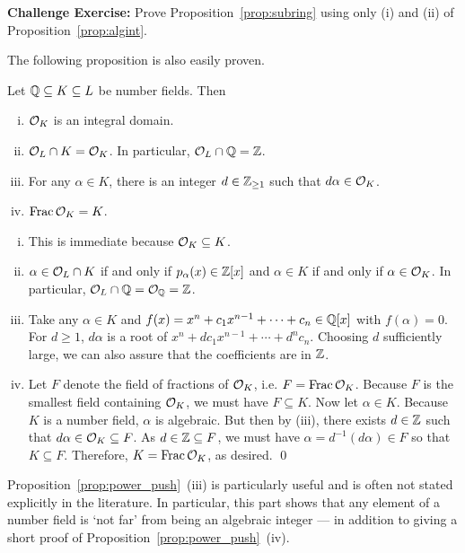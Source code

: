\noindent \textbf{Challenge Exercise:} Prove Proposition~\ref{prop:subring} using only (i) and (ii) of Proposition~\ref{prop:algint}. \pskip


The following proposition is also easily proven. 


\begin{prop} \label{prop:power_push} 
Let $\mathbb{Q} \subseteq K \subseteq L$ be number fields. Then
\begin{enumerate}[(i)]
\item $\mathcal{O}_K$ is an integral domain.
\item $\mathcal{O}_L \cap K= \mathcal{O}_K$. In particular, $\mathcal{O}_L \cap \mathbb{Q}= \mathbb{Z}$.
\item For any $\alpha \in K$, there is an integer $d \in \mathbb{Z}_{\geq 1}$ such that $d \alpha \in \mathcal{O}_K$.
\item $\operatorname{Frac} \mathcal{O}_K= K$.
\end{enumerate}
\end{prop}

\pf \hfill
\begin{enumerate}[(i)]
\item This is immediate because $\mathcal{O}_K \subseteq K$.

\item $\alpha \in \mathcal{O}_L \cap K$ if and only if $p_\alpha(x) \in \mathbb{Z}[x]$ and $\alpha \in K$ if and only if $\alpha \in \mathcal{O}_K$. In particular, $\mathcal{O}_L \cap \mathbb{Q}= \mathcal{O}_{\mathbb{Q}}= \mathbb{Z}$.

\item Take any $\alpha \in K$ and $f(x)= x^n + c_1 x^{n-1} + \cdots + c_n \in \mathbb{Q}[x]$ with $f(\alpha)= 0$. For $d \geq 1$, $d \alpha$ is a root of $x^n + d c_1 x^{n-1} + \cdots + d^n c_n$. Choosing $d$ sufficiently large, we can also assure that the coefficients are in $\mathbb{Z}$. 

\item Let $F$ denote the field of fractions of $\mathcal{O}_K$, i.e. $F= \operatorname{Frac} \mathcal{O}_K$. Because $F$ is the smallest field containing $\mathcal{O}_K$, we must have $F \subseteq K$. Now let $\alpha \in K$. Because $K$ is a number field, $\alpha$ is algebraic. But then by (iii), there exists $d \in \mathbb{Z}$ such that $d \alpha \in \mathcal{O}_K \subseteq F$. As $d \in \mathbb{Z} \subseteq F$, we must have $\alpha= d^{-1}(d\alpha) \in F$ so that $K \subseteq F$. Therefore, $K= \operatorname{Frac} \mathcal{O}_K$, as desired. \qed 
\end{enumerate}


Proposition~\ref{prop:power_push}~(iii) is particularly useful and is often not stated explicitly in the literature. In particular, this part shows that any element of a number field is `not far' from being an algebraic integer --- in addition to giving a short proof of Proposition~\ref{prop:power_push}~(iv).



